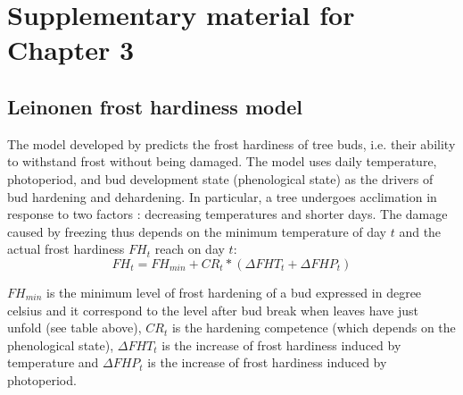 
\section{Supplementary material for Chapter 3} \label{app:chapter3}

\vspace*{1cm}



\begin{landscape}

\end{landscape}
\restoregeometry

\newpage

%

\subsection{Leinonen frost hardiness model}

The model developed by \cite{Leinonen1996} predicts the frost hardiness of tree buds, i.e. their ability to withstand frost without being damaged. The model uses daily temperature, photoperiod, and bud development state (phenological state) as the drivers of bud hardening and dehardening. In particular, a tree undergoes acclimation in response to two factors : decreasing temperatures and shorter days. The damage caused by freezing thus depends on the minimum temperature of day $t$ and the actual frost hardiness $FH_t$ reach on day $t$:
\begin{equation}
FH_t = FH_{min} + CR_t * (\Delta FHT_t + \Delta FHP_t)
\end{equation}

\noindent $FH_{min}$ is the minimum level of frost hardening of a bud expressed in degree celsius and it correspond to the level after bud break when leaves have just unfold (see table above), $CR_t$ is the hardening competence (which depends on the phenological state), $\Delta FHT_t$ is the increase of frost hardiness induced by temperature and $\Delta FHP_t$ is the increase of frost hardiness induced by photoperiod.

